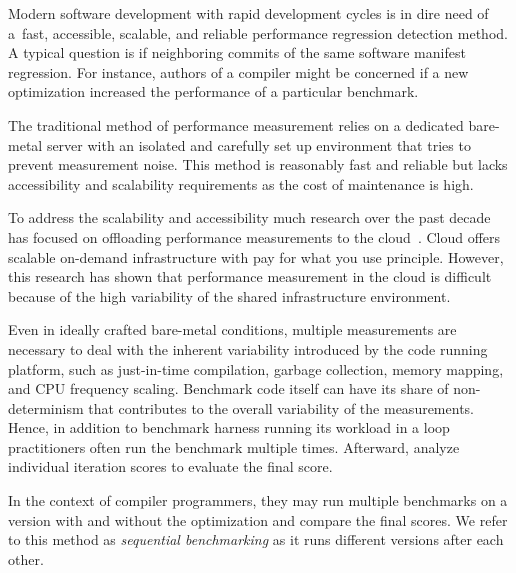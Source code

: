 
Modern software development with rapid development cycles is in dire need of a~fast, accessible, scalable, and reliable performance regression detection method.
A typical question is if neighboring commits of the same software manifest regression.
For instance, authors of a compiler might be concerned if a new optimization increased the performance of a particular benchmark.

The traditional method of performance measurement relies on a dedicated bare-metal server with an isolated and carefully set up environment that tries to prevent measurement noise.
This method is reasonably fast and reliable but lacks accessibility and scalability requirements as the cost of maintenance is high.

To address the scalability and accessibility much research over the past decade has focused on offloading performance measurements to the cloud~\cite{leitner2016patterns, laaber2019software, abedi2017conducting}.
Cloud offers scalable \mbox{on-demand} infrastructure with pay for what you use principle.
However, this research has shown that performance measurement in the cloud is difficult because of the high variability of the shared infrastructure environment.

Even in ideally crafted \mbox{bare-metal} conditions, multiple measurements are necessary to deal with the inherent variability introduced by the code running platform, such as \mbox{just-in-time} compilation, garbage collection, memory mapping, and CPU frequency scaling.
Benchmark code itself can have its share of non-determinism that contributes to the overall variability of the measurements.
Hence, in addition to benchmark harness running its workload in a loop practitioners often run the benchmark multiple times.
Afterward, analyze individual iteration scores to evaluate the final score.

In the context of compiler programmers, they may run multiple benchmarks on a version with and without the optimization and compare the final scores.
We refer to this method as \emph{sequential benchmarking} as it runs different versions after each other.


